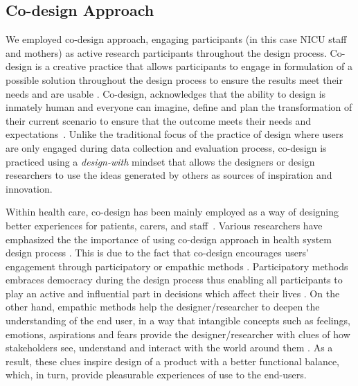 \subsection{Co-design Approach}
We employed co-design approach, engaging participants (in this case NICU staff and mothers) as active research participants throughout the design process. Co-design is a creative practice that allows participants to engage in formulation of a possible solution throughout the design process to ensure the results meet their needs and are usable \citep{Sanders2008a, Nilsson2016}. Co-design, acknowledges that the ability to design is inmately human  and everyone can imagine, define and plan the transformation of their current scenario to ensure that the outcome meets their needs and expectations~\citep{Saunder2011, SarmientoPelayo2015}. Unlike the traditional focus of the practice of design where users are only engaged during data collection and evaluation process, co-design is practiced using a \textit{design-with} mindset that allows the designers or design researchers to use the ideas generated by others as sources of inspiration and innovation.

Within health care, co-design has been mainly employed as a way of designing better experiences for patients, carers, and staff~\citep{Piper2018, Timmerman2016, Ward2018}. Various researchers have emphasized the the importance of  using co-design approach in health system design process \citep{Piper2018, Timmerman2016, Birnbaum2016, Wolstenholme2017, Robert2015}. This is due to the fact that co-design encourages users' engagement through participatory or empathic methods \citep{Piper2018}. Participatory methods embraces democracy during the design process thus enabling all participants to play an active and influential part in decisions which affect their lives \citep{Wadley2016, Hussain2012}.  On the other hand, empathic methods help the designer/researcher to deepen the understanding of the end user, in a way that intangible concepts such as feelings, emotions, aspirations and fears provide the designer/researcher with clues of how stakeholders see, understand and interact  with the world around them \citep{SarmientoPelayo2015, Schneider2018a}. As a result, these clues inspire design of a product with a better functional balance, which, in turn, provide pleasurable experiences of use to the end-users.

